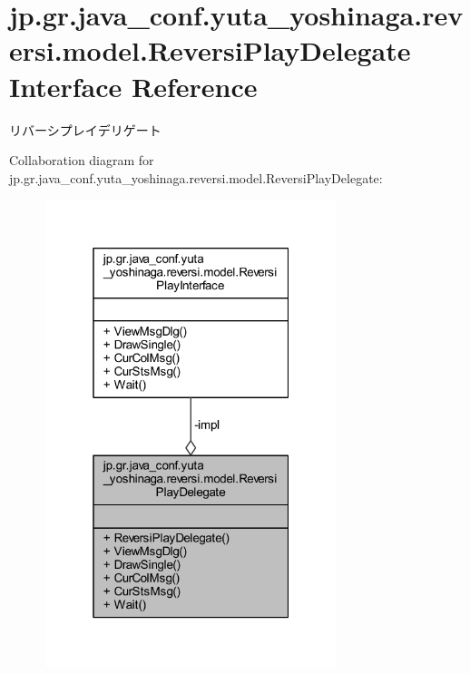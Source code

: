 \hypertarget{classjp_1_1gr_1_1java__conf_1_1yuta__yoshinaga_1_1reversi_1_1model_1_1_reversi_play_delegate}{}\section{jp.\+gr.\+java\+\_\+conf.\+yuta\+\_\+yoshinaga.\+reversi.\+model.\+Reversi\+Play\+Delegate Interface Reference}
\label{classjp_1_1gr_1_1java__conf_1_1yuta__yoshinaga_1_1reversi_1_1model_1_1_reversi_play_delegate}


リバーシプレイデリゲート  




Collaboration diagram for jp.\+gr.\+java\+\_\+conf.\+yuta\+\_\+yoshinaga.\+reversi.\+model.\+Reversi\+Play\+Delegate\+:\nopagebreak
\begin{figure}[H]
\begin{center}
\leavevmode
\includegraphics[width=241pt]{classjp_1_1gr_1_1java__conf_1_1yuta__yoshinaga_1_1reversi_1_1model_1_1_reversi_play_delegate__coll__graph}
\end{center}
\end{figure}
